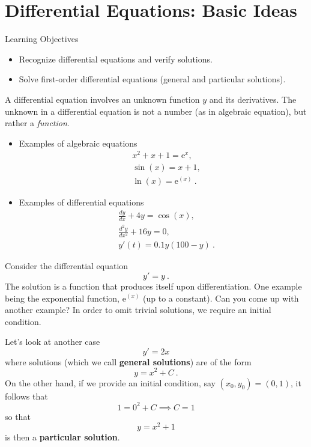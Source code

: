 \documentclass[compacto,10pt,comentarios]{aleph-notas}
\begin{document}
\encabezado

\section*{Differential Equations: Basic Ideas}
\begin{mdframed}
    \center Learning Objectives \\
    \begin{itemize}
        \item Recognize differential equations and verify solutions.
        \item Solve first-order differential equations (general and particular solutions).
    \end{itemize}
\end{mdframed}

A differential equation involves an unknown function $y$ and its derivatives. The unknown in a differential equation is not a number (as in algebraic equation), but rather a \textit{function}.
\begin{itemize}
    \item Examples of algebraic equations
    \begin{align*}
        & x^2 + x + 1 = \mathrm{e}^{x}, \\
        & \sin(x) = x + 1, \\ 
        & \ln(x) = \mathrm{e}^{(x)} ~ .
    \end{align*}
    \item Examples of differential equations
    \begin{align*}
        & \frac{dy}{dx} + 4y = \cos(x), \\
        & \frac{d^2y}{dx^2} + 16y = 0, \\
        & y'(t) = 0.1y(100 - y) ~ .
    \end{align*}
\end{itemize}
    Consider the differential equation
    $$
        y' = y ~ .
    $$
    The solution is a function that produces itself upon differentiation. One example being the exponential function, $\mathrm{e}^{(x)}$ (up to a constant). Can you come up with another example? In order to omit trivial solutions, we require an initial condition.

    Let's look at another case
    $$
        y' = 2x
    $$
    where solutions (which we call \textbf{general solutions}) are of the form 
    $$
        y = x^{2} + C ~ .
    $$
    On the other hand, if we provide an initial condition, say $(x_0, y_0) = (0, 1)$, it follows that
    $$
        1 = 0^2 + C \implies C = 1
    $$
    so that
    $$
        y = x^{2} + 1 
    $$
    is then a \textbf{particular solution}.
\end{document}

